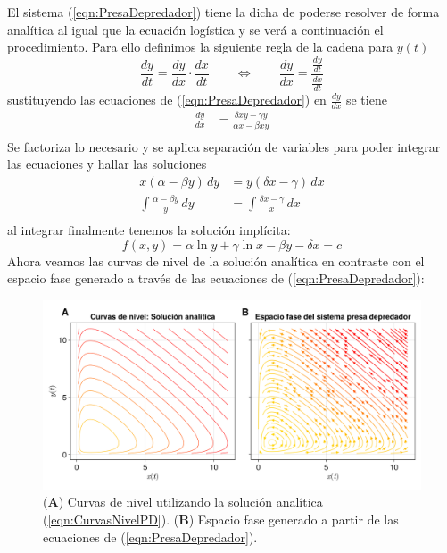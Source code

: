 El sistema (\ref{eqn:PresaDepredador}) tiene la dicha de poderse resolver de forma analítica al igual que la ecuación logística y se verá a continuación el procedimiento. Para ello definimos la siguiente regla de la cadena para $y(t)$
$$\frac{dy}{dt} = \frac{dy}{dx}\cdot\frac{dx}{dt}\qquad\Longleftrightarrow\qquad\frac{dy}{dx}=\frac{\frac{dy}{dt}}{\frac{dx}{dt}}$$
sustituyendo las ecuaciones de (\ref{eqn:PresaDepredador}) en $\frac{dy}{dx}$ se tiene
\begin{align*}
	\frac{dy}{dx}&=\frac{\delta xy-\gamma y}{\alpha x-\beta xy}  \\
\end{align*}
Se factoriza lo necesario y se aplica separación de variables para poder integrar las ecuaciones y hallar las soluciones
\begin{align*}
	x(\alpha-\beta y)\, dy &= y(\delta x-\gamma)\, dx\\
	\int \frac{\alpha-\beta y}{y}\, dy &= \int \frac{\delta x-\gamma}{x}\, dx \\
\end{align*}
al integrar finalmente tenemos la solución implícita:
\begin{equation}\label{eqn:CurvasNivelPD}
	f(x,y)=\alpha\ln y+\gamma\ln x-\beta y- \delta x=c
\end{equation}
Ahora veamos las curvas de nivel de la solución analítica en contraste con el espacio fase generado a través de las ecuaciones de (\ref{eqn:PresaDepredador}):
\begin{figure}[h!]
	\centering
	\includegraphics[scale=0.22]{../../Imagenes/Curvas de nivel PD}
	\caption{(\textbf{A}) Curvas de nivel utilizando la solución analítica (\ref{eqn:CurvasNivelPD}). (\textbf{B}) Espacio fase generado a partir de las ecuaciones de (\ref{eqn:PresaDepredador}).}
	\label{fig:CurvasNivelPD}
\end{figure}

